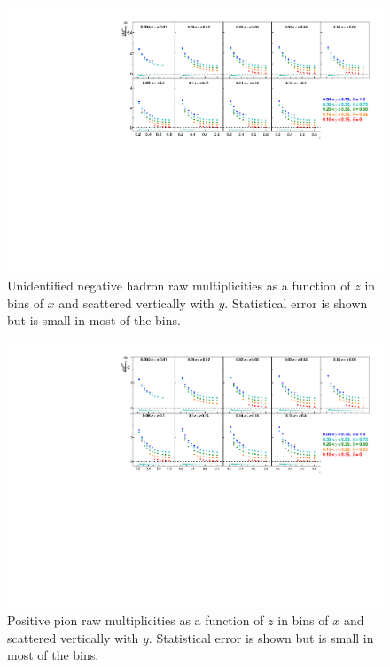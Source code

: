 \begin{figure}[!h]
  \includegraphics[scale=0.85]{./gfx/rawhm.pdf}
  \caption{Unidentified negative hadron raw multiplicities as a function of $z$ in bins of $x$ and scattered vertically with $y$. Statistical error is shown but is small in most of the bins.}
  \label{pic:rawhm}
\end{figure}

\begin{figure}[!h]
  \includegraphics[scale=0.85]{./gfx/rawpip.pdf}
  \caption{Positive pion raw multiplicities as a function of $z$ in bins of $x$ and scattered vertically with $y$. Statistical error is shown but is small in most of the bins.}
  \label{pic:rawpip}
\end{figure}

